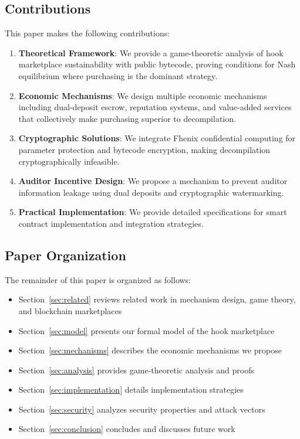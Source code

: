 \documentclass[11pt,a4paper]{article}
\theoremstyle{definition}
\theoremstyle{remark}
\begin{document}
\subsection{Contributions}

This paper makes the following contributions:

\begin{enumerate}
    \item \textbf{Theoretical Framework}: We provide a game-theoretic analysis of hook marketplace sustainability with public bytecode, proving conditions for Nash equilibrium where purchasing is the dominant strategy.
    
    \item \textbf{Economic Mechanisms}: We design multiple economic mechanisms including dual-deposit escrow, reputation systems, and value-added services that collectively make purchasing superior to decompilation.
    
    \item \textbf{Cryptographic Solutions}: We integrate Fhenix confidential computing for parameter protection and bytecode encryption, making decompilation cryptographically infeasible.
    
    \item \textbf{Auditor Incentive Design}: We propose a mechanism to prevent auditor information leakage using dual deposits and cryptographic watermarking.
    
    \item \textbf{Practical Implementation}: We provide detailed specifications for smart contract implementation and integration strategies.
\end{enumerate}

\subsection{Paper Organization}

The remainder of this paper is organized as follows:
\begin{itemize}
    \item Section~\ref{sec:related} reviews related work in mechanism design, game theory, and blockchain marketplaces
    \item Section~\ref{sec:model} presents our formal model of the hook marketplace
    \item Section~\ref{sec:mechanisms} describes the economic mechanisms we propose
    \item Section~\ref{sec:analysis} provides game-theoretic analysis and proofs
    \item Section~\ref{sec:implementation} details implementation strategies
    \item Section~\ref{sec:security} analyzes security properties and attack vectors
    \item Section~\ref{sec:conclusion} concludes and discusses future work
\end{itemize}
\end{document}

